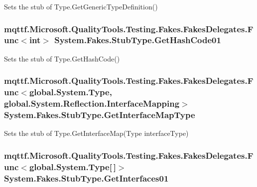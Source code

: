 Sets the stub of Type.\-Get\-Generic\-Type\-Definition()

\hypertarget{class_system_1_1_fakes_1_1_stub_type_accbb714368ca7128d9f36d772e09de00}{
\subsubsection[{Get\-Hash\-Code01}]{\setlength{\rightskip}{0pt plus 5cm}mqttf.\-Microsoft.\-Quality\-Tools.\-Testing.\-Fakes.\-Fakes\-Delegates.\-Func$<$int$>$ System.\-Fakes.\-Stub\-Type.\-Get\-Hash\-Code01}}\label{class_system_1_1_fakes_1_1_stub_type_accbb714368ca7128d9f36d772e09de00}


Sets the stub of Type.\-Get\-Hash\-Code()

\hypertarget{class_system_1_1_fakes_1_1_stub_type_aa4d91c8b71269e017d7f7f851d8ca3b7}{
\subsubsection[{Get\-Interface\-Map\-Type}]{\setlength{\rightskip}{0pt plus 5cm}mqttf.\-Microsoft.\-Quality\-Tools.\-Testing.\-Fakes.\-Fakes\-Delegates.\-Func$<$global.\-System.\-Type, global.\-System.\-Reflection.\-Interface\-Mapping$>$ System.\-Fakes.\-Stub\-Type.\-Get\-Interface\-Map\-Type}}\label{class_system_1_1_fakes_1_1_stub_type_aa4d91c8b71269e017d7f7f851d8ca3b7}


Sets the stub of Type.\-Get\-Interface\-Map(\-Type interface\-Type)

\hypertarget{class_system_1_1_fakes_1_1_stub_type_a000b41aecec03121d18b14da16c402a3}{
\subsubsection[{Get\-Interfaces01}]{\setlength{\rightskip}{0pt plus 5cm}mqttf.\-Microsoft.\-Quality\-Tools.\-Testing.\-Fakes.\-Fakes\-Delegates.\-Func$<$global.\-System.\-Type\mbox{[}$\,$\mbox{]}$>$ System.\-Fakes.\-Stub\-Type.\-Get\-Interfaces01}}\label{class_system_1_1_fakes_1_1_stub_type_a000b41aecec03121d18b14da16c402a3}


